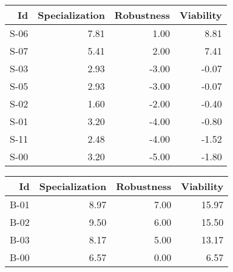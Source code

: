 


\begin{tabular}{ | r | r | r | r | }
    \hline
                    Id  &  Specialization  &      Robustness  &       Viability  \\
    \hline
    \hline
                  S-06  &            7.81  &            1.00  &            8.81  \\
    \hline
                  S-07  &            5.41  &            2.00  &            7.41  \\
    \hline
                  S-03  &            2.93  &           -3.00  &           -0.07  \\
    \hline
                  S-05  &            2.93  &           -3.00  &           -0.07  \\
    \hline
                  S-02  &            1.60  &           -2.00  &           -0.40  \\
    \hline
                  S-01  &            3.20  &           -4.00  &           -0.80  \\
    \hline
                  S-11  &            2.48  &           -4.00  &           -1.52  \\
    \hline
                  S-00  &            3.20  &           -5.00  &           -1.80  \\
    \hline
\end{tabular}


\begin{tabular}{ | r | r | r | r | }
    \hline
                    Id  &  Specialization  &      Robustness  &       Viability  \\
    \hline
    \hline
                  B-01  &            8.97  &            7.00  &           15.97  \\
    \hline
                  B-02  &            9.50  &            6.00  &           15.50  \\
    \hline
                  B-03  &            8.17  &            5.00  &           13.17  \\
    \hline
                  B-00  &            6.57  &            0.00  &            6.57  \\
    \hline
\end{tabular}


